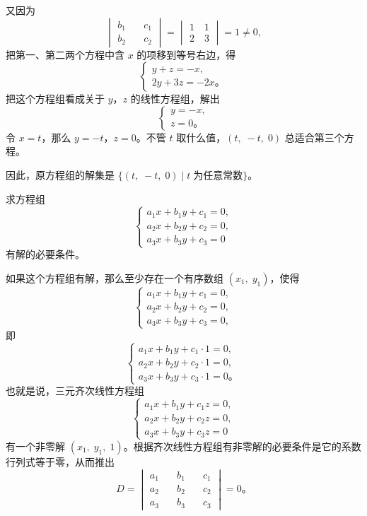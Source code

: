 又因为
$$\begin{vmatrix*}
    b_1 \quad & c_1 \\
    b_2 \quad & c_2
\end{vmatrix*} = \begin{vmatrix*}
    1 \quad 1 \\
    2 \quad 3
\end{vmatrix*} = 1 \neq 0,
$$
把第一、第二两个方程中含 $x$ 的项移到等号右边，得
$$\begin{cases}
    y + z = -x, \\
    2y + 3z = -2x \text{。}
\end{cases}$$
把这个方程组看成关于 $y$，$z$ 的线性方程组，解出
$$\begin{cases}
    y = -x, \\
    z = 0 \text{。}
\end{cases}$$
令 $x = t$，那么 $y = -t$，$z = 0$。不管 $t$ 取什么值，$(t,\; -t,\; 0)$ 总适合第三个方程。

因此，原方程组的解集是 $\{ (t,\; -t,\; 0) \mid  t\; \text{为任意常数} \}$。



\liti 求方程组
$$\begin{cases}
    a_1x + b_1y + c_1 = 0, \\
    a_2x + b_2y + c_2 = 0, \\
    a_3x + b_3y + c_3 = 0
\end{cases}$$
有解的必要条件。

\jie 如果这个方程组有解，那么至少存在一个有序数组 $(x_1,\; y_1)$，使得
$$\begin{cases}
    a_1x + b_1y + c_1 = 0, \\
    a_2x + b_2y + c_2 = 0, \\
    a_3x + b_3y + c_3 = 0,
\end{cases}$$
即
$$\begin{cases}
    a_1x + b_1y + c_1 \cdot 1 = 0, \\
    a_2x + b_2y + c_2 \cdot 1 = 0, \\
    a_3x + b_3y + c_3 \cdot 1 = 0 \text{。}
\end{cases}$$
也就是说，三元齐次线性方程组
$$\begin{cases}
    a_1x + b_1y + c_1z = 0, \\
    a_2x + b_2y + c_2z = 0, \\
    a_3x + b_3y + c_3z = 0
\end{cases}$$
有一个非零解 $(x_1,\; y_1,\; 1)$。根据齐次线性方程组有非零解的必要条件是它的系数行列式等于零，从而推出
$$D = \begin{vmatrix*}
	a_1 \quad & b_1 \quad & c_1 \\
	a_2 \quad & b_2 \quad & c_2 \\
	a_3 \quad & b_3 \quad & c_3
\end{vmatrix*} = 0 \text{。}$$

